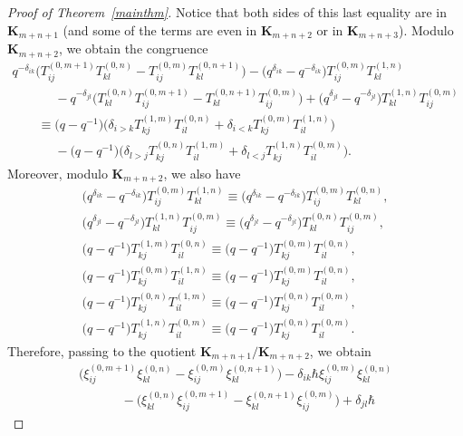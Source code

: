 \documentclass[11pt]{article}
\numberwithin{theorem}{section}
\numberwithin{proposition}{section}
\numberwithin{lemma}{section}
\numberwithin{corollary}{section}
\numberwithin{definition}{section}
\numberwithin{example}{section}
\numberwithin{remark}{section}
\numberwithin{note}{section}
\numberwithin{equation}{section}
\begin{document}
\begin{proof}[Proof of Theorem~\ref{mainthm}]
Notice that both sides of this last equality are in $\mathbf{K}_{m+n+1}$ (and some of the terms are even in
$\mathbf{K}_{m+n+2}$ or in $\mathbf{K}_{m+n+3}$).
Modulo $\mathbf{K}_{m+n+2}$, we obtain the congruence
\begin{gather*}
q^{-\delta_{ik}} \big(T_{ij}^{(0,m+1)} T_{kl}^{(0,n)}- T_{ij}^{(0,m)} T_{kl}^{(0,n+1)} \big) - \big(q^{\delta_{ik}} -
q^{-\delta_{ik}}\big) T_{ij}^{(0,m)} T_{kl}^{(1,n)}
\\
\qquad\phantom{=}{}
  - q^{-\delta_{jl}} \big(T_{kl}^{(0,n)} T_{ij}^{(0,m+1)} - T_{kl}^{(0,n+1)} T_{ij}^{(0,m)} \big) + \big(q^{\delta_{jl}} -
q^{-\delta_{jl}}\big) T_{kl}^{(1,n)} T_{ij}^{(0,m)}
\\
\qquad
\equiv \big(q-q^{-1}\big) \big(  \delta_{i>k} T_{kj}^{(1,m)} T_{il}^{(0,n)} + \delta_{i<k} T_{kj}^{(0,m)} T_{il}^{(1,n)}\big)
\\
\qquad\phantom{=}{}
  - \big(q-q^{-1}\big) \big(\delta_{l>j} T_{kj}^{(0,n)} T_{il}^{(1,m)} + \delta_{l<j} T_{kj}^{(1,n)} T_{il}^{(0,m)}\big).
\end{gather*}
Moreover, modulo $\mathbf{K}_{m+n+2}$, we also have
\begin{gather*}
\big(q^{\delta_{ik}} - q^{-\delta_{ik}}\big) T_{ij}^{(0,m)} T_{kl}^{(1,n)} \equiv \big(q^{\delta_{ik}} - q^{-\delta_{ik}}\big)
T_{ij}^{(0,m)} T_{kl}^{(0,n)},
\\
\big(q^{\delta_{jl}}-q^{-\delta_{jl}}\big) T_{kl}^{(1,n)} T_{ij}^{(0,m)} \equiv \big(q^{\delta_{jl}}-q^{-\delta_{jl}}\big)
T_{kl}^{(0,n)} T_{ij}^{(0,m)},
\\
\big(q-q^{-1}\big) T_{kj}^{(1,m)} T_{il}^{(0,n)} \equiv \big(q-q^{-1}\big)T_{kj}^{(0,m)} T_{il}^{(0,n)},
\\
\big(q-q^{-1}\big) T_{kj}^{(0,m)}
T_{il}^{(1,n)} \equiv \big(q-q^{-1}\big) T_{kj}^{(0,m)} T_{il}^{(0,n)},
\\
\big(q-q^{-1}\big) T_{kj}^{(0,n)} T_{il}^{(1,m)} \equiv \big(q-q^{-1}\big) T_{kj}^{(0,n)} T_{il}^{(0,m)},
\\
\big(q-q^{-1}\big) T_{kj}^{(1,n)}
T_{il}^{(0,m)} \equiv \big(q-q^{-1}\big) T_{kj}^{(0,n)} T_{il}^{(0,m)}.
\end{gather*}
Therefore, passing to the quotient $\mathbf{K}_{m+n+1}/\mathbf{K}_{m+n+2}$, we obtain
\begin{gather*}
\big(\xi_{ij}^{(0,m+1)} \xi_{kl}^{(0,n)} - \xi_{ij}^{(0,m)} \xi_{kl}^{(0,n+1)} \big)- \delta_{ik} \hbar
\xi_{ij}^{(0,m)} \xi_{kl}^{(0,n)}
\\
\qquad\phantom{=}{}
  - \big(\xi_{kl}^{(0,n)} \xi_{ij}^{(0,m+1)} - \xi_{kl}^{(0,n+1)} \xi_{ij}^{(0,m)} \big) + \delta_{jl} \hbar

\end{gather*}
\end{proof}
\end{document}
